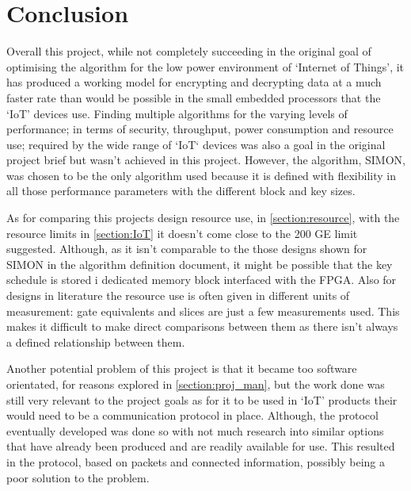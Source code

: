 \documentclass[12pt,twoside,a4paper]{report}
\begin{document}
	\section{Conclusion}
	Overall this project, while not completely succeeding in the original goal of optimising the algorithm for the low power environment of `Internet of Things', it has produced a working model for encrypting and decrypting data at a much faster rate than would be possible in the small embedded processors that the `IoT' devices use. Finding multiple algorithms for the varying levels of performance; in terms of security, throughput, power consumption and resource use; required by the wide range of `IoT` devices was also a goal in the original project brief but wasn't achieved in this project. However, the algorithm, SIMON,  was chosen to be the only algorithm used because it is defined with flexibility in all those performance parameters with the different block and key sizes.
	
	As for comparing this projects design resource use, in \autoref{section:resource}, with the resource limits in \autoref{section:IoT} it doesn't come close to the 200 GE limit suggested. Although, as it isn't comparable to the those designs shown for SIMON in the algorithm definition document, it might be possible that the key schedule is stored i dedicated memory block interfaced with the FPGA. Also for designs in literature the resource use is often given in different units of measurement: gate equivalents and slices are just a few measurements used. This makes it difficult to make direct comparisons between them as there isn't always a defined relationship between them.
	
	Another potential problem of this project is that it became too software orientated, for reasons explored in \autoref{section:proj_man}, but the work done was still very relevant to the project goals as for it to be used in `IoT' products their would need to be a communication protocol in place. Although, the protocol eventually developed was done so with not much research into similar options that have already been produced and are readily available for use. This resulted in the protocol, based on packets and connected information, possibly being a poor solution to the problem.
	
\end{document}

